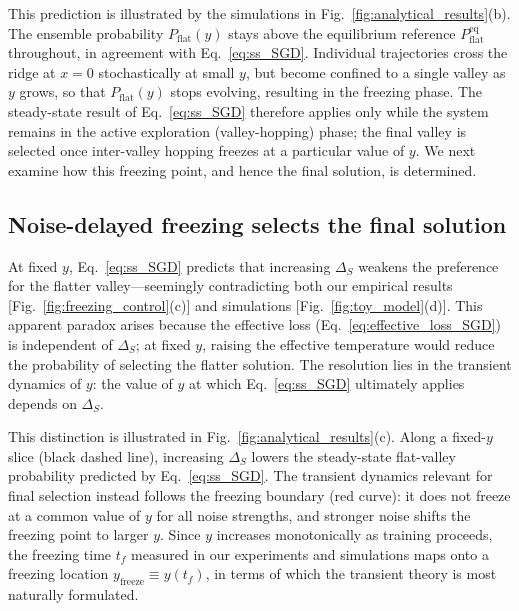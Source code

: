 \documentclass[aps,prx,reprint,superscriptaddress,longbibliography,nofootinbib,floatfix]{revtex4-2}
\begin{document}
This prediction is illustrated by the simulations in Fig.~\ref{fig:analytical_results}(b). The ensemble probability $P_{\mathrm{flat}}(y)$ stays above the equilibrium reference $P_{\mathrm{flat}}^{\mathrm{eq}}$ throughout, in agreement with Eq.~\ref{eq:ss_SGD}. Individual trajectories cross the ridge at $x=0$ stochastically at small $y$, but become confined to a single valley as $y$ grows, so that $P_{\mathrm{flat}}(y)$ stops evolving, resulting in the freezing phase. The steady-state result of Eq.~\ref{eq:ss_SGD} therefore applies only while the system remains in the active exploration (valley-hopping) phase; the final valley is selected once inter-valley hopping freezes at a particular value of $y$. We next examine how this freezing point, and hence the final solution, is determined.

\subsection{Noise-delayed freezing selects the final solution}
At fixed $y$, Eq.~\ref{eq:ss_SGD} predicts that increasing $\Delta_S$ weakens the preference for the flatter valley---seemingly contradicting both our empirical results [Fig.~\ref{fig:freezing_control}(c)] and simulations [Fig.~\ref{fig:toy_model}(d)]. This apparent paradox arises because the effective loss (Eq.~\ref{eq:effective_loss_SGD}) is independent of $\Delta_S$; at fixed $y$, raising the effective temperature would reduce the probability of selecting the flatter solution. The resolution lies in the transient dynamics of $y$: the value of $y$ at which Eq.~\ref{eq:ss_SGD} ultimately applies depends on $\Delta_S$.

This distinction is illustrated in Fig.~\ref{fig:analytical_results}(c). Along a fixed-$y$ slice (black dashed line), increasing $\Delta_S$ lowers the steady-state flat-valley probability predicted by Eq.~\ref{eq:ss_SGD}. The transient dynamics relevant for final selection instead follows the freezing boundary (red curve): it does not freeze at a common value of $y$ for all noise strengths, and stronger noise shifts the freezing point to larger $y$. Since $y$ increases monotonically as training proceeds, the freezing time $t_f$ measured in our experiments and simulations maps onto a freezing location $y_{\mathrm{freeze}} \equiv y(t_f)$, in terms of which the transient theory is most naturally formulated.
\end{document}
